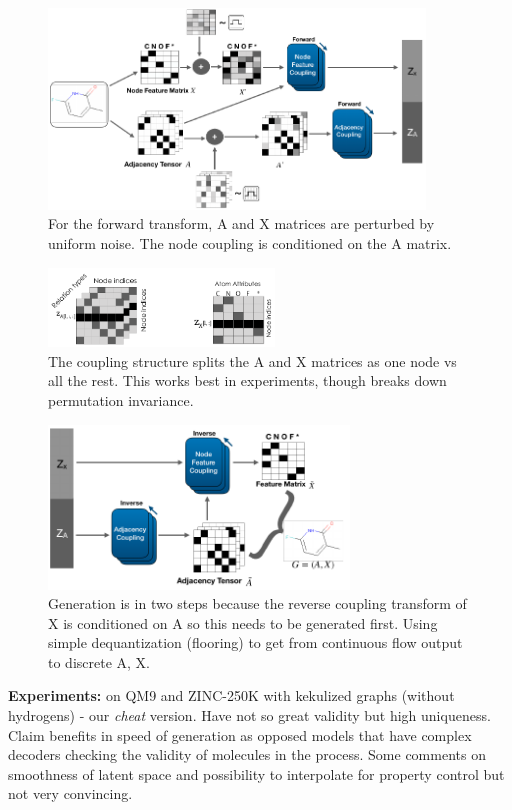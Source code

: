 \begin{figure}[ht]
\centering
\includegraphics[width=10cm]{graphNVP_Figure1.png}
\caption{For the forward transform, A and X matrices are perturbed by uniform noise. The node coupling is conditioned on the A matrix.}
\end{figure}

\begin{figure}[ht]
\centering
\includegraphics[width=6cm]{graphNVP_Figure2.png}
\caption{The coupling structure splits the A and X matrices as one node vs all the rest. This works best in experiments, though breaks down permutation invariance.}
\end{figure}

\begin{figure}[ht]
\centering
\includegraphics[width=8cm]{graphNVP_Figure3.png}
\caption{Generation is in two steps because the reverse coupling transform of X is conditioned on A so this needs to be generated first. Using simple dequantization (flooring) to get from continuous flow output to discrete A, X.}
\end{figure}

\textbf{Experiments:} on QM9 and ZINC-250K with kekulized graphs (without hydrogens) - our \emph{cheat} version.
Have not so great validity but high uniqueness.
Claim benefits in speed of generation as opposed models that have complex decoders checking the validity of molecules in the process.
Some comments on smoothness of latent space and possibility to interpolate for property control but not very convincing.
